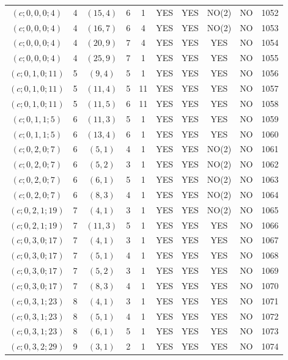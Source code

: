 \begin{longtable}{|c|c|c|c|c|c|c|c|c|c|}
$(c; 0, 0, 0; 4)$ & 4 & $(15, 4)$ & 6 & 1 & YES & YES & NO(2) & NO & 1052\\
$(c; 0, 0, 0; 4)$ & 4 & $(16, 7)$ & 6 & 4 & YES & YES & NO(2) & NO & 1053\\
$(c; 0, 0, 0; 4)$ & 4 & $(20, 9)$ & 7 & 4 & YES & YES & YES & NO & 1054\\
$(c; 0, 0, 0; 4)$ & 4 & $(25, 9)$ & 7 & 1 & YES & YES & YES & NO & 1055\\
$(c; 0, 1, 0; 11)$ & 5 & $(9, 4)$ & 5 & 1 & YES & YES & YES & NO & 1056\\
$(c; 0, 1, 0; 11)$ & 5 & $(11, 4)$ & 5 & 11 & YES & YES & YES & NO & 1057\\
$(c; 0, 1, 0; 11)$ & 5 & $(11, 5)$ & 6 & 11 & YES & YES & YES & NO & 1058\\
$(c; 0, 1, 1; 5)$ & 6 & $(11, 3)$ & 5 & 1 & YES & YES & YES & NO & 1059\\
$(c; 0, 1, 1; 5)$ & 6 & $(13, 4)$ & 6 & 1 & YES & YES & YES & NO & 1060\\
$(c; 0, 2, 0; 7)$ & 6 & $(5, 1)$ & 4 & 1 & YES & YES & NO(2) & NO & 1061\\
$(c; 0, 2, 0; 7)$ & 6 & $(5, 2)$ & 3 & 1 & YES & YES & NO(2) & NO & 1062\\
$(c; 0, 2, 0; 7)$ & 6 & $(6, 1)$ & 5 & 1 & YES & YES & NO(2) & NO & 1063\\
$(c; 0, 2, 0; 7)$ & 6 & $(8, 3)$ & 4 & 1 & YES & YES & NO(2) & NO & 1064\\
$(c; 0, 2, 1; 19)$ & 7 & $(4, 1)$ & 3 & 1 & YES & YES & NO(2) & NO & 1065\\
$(c; 0, 2, 1; 19)$ & 7 & $(11, 3)$ & 5 & 1 & YES & YES & YES & NO & 1066\\
$(c; 0, 3, 0; 17)$ & 7 & $(4, 1)$ & 3 & 1 & YES & YES & YES & NO & 1067\\
$(c; 0, 3, 0; 17)$ & 7 & $(5, 1)$ & 4 & 1 & YES & YES & YES & NO & 1068\\
$(c; 0, 3, 0; 17)$ & 7 & $(5, 2)$ & 3 & 1 & YES & YES & YES & NO & 1069\\
$(c; 0, 3, 0; 17)$ & 7 & $(8, 3)$ & 4 & 1 & YES & YES & YES & NO & 1070\\
$(c; 0, 3, 1; 23)$ & 8 & $(4, 1)$ & 3 & 1 & YES & YES & YES & NO & 1071\\
$(c; 0, 3, 1; 23)$ & 8 & $(5, 1)$ & 4 & 1 & YES & YES & YES & NO & 1072\\
$(c; 0, 3, 1; 23)$ & 8 & $(6, 1)$ & 5 & 1 & YES & YES & YES & NO & 1073\\
$(c; 0, 3, 2; 29)$ & 9 & $(3, 1)$ & 2 & 1 & YES & YES & YES & NO & 1074\\

\end{longtable}
